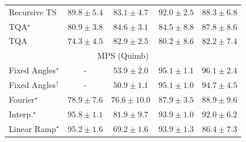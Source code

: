 \begin{tabular}{l|cccc|}
Recursive TS & {\cellcolor[HTML]{821781}} \color[HTML]{F1F1F1} $89.8\pm 5.4$ & {\cellcolor[HTML]{8950A4}} \color[HTML]{F1F1F1} $83.1\pm 4.7$ & {\cellcolor[HTML]{760C71}} \color[HTML]{F1F1F1} $92.0\pm 2.5$ & {\cellcolor[HTML]{84258B}} \color[HTML]{F1F1F1} $88.3\pm 6.8$ \\
TQA$^\star$ & {\cellcolor[HTML]{8B60AC}} \color[HTML]{F1F1F1} $80.9\pm 3.8$ & {\cellcolor[HTML]{88449E}} \color[HTML]{F1F1F1} $84.6\pm 3.1$ & {\cellcolor[HTML]{88459F}} \color[HTML]{F1F1F1} $84.5\pm 8.8$ & {\cellcolor[HTML]{85288D}} \color[HTML]{F1F1F1} $87.8\pm 8.6$ \\
TQA & {\cellcolor[HTML]{8C91C4}} \color[HTML]{F1F1F1} $74.3\pm 4.5$ & {\cellcolor[HTML]{8A51A5}} \color[HTML]{F1F1F1} $82.9\pm 2.5$ & {\cellcolor[HTML]{8B65AE}} \color[HTML]{F1F1F1} $80.2\pm 8.6$ & {\cellcolor[HTML]{8A56A7}} \color[HTML]{F1F1F1} $82.2\pm 7.4$ \\
\cline{1-5}
\multicolumn{5}{c}{\rule{0pt}{8pt}MPS (Quimb)} \\
\midrule
Fixed Angles$^\star$ & {\cellcolor[HTML]{000000}} \color[HTML]{F1F1F1} {\cellcolor{white}} \color{black} - & {\cellcolor[HTML]{FFFBD0}} \color[HTML]{000000} $53.9\pm 2.0$ & {\cellcolor[HTML]{712806}} \color[HTML]{F1F1F1} $95.1\pm 1.1$ & {\cellcolor[HTML]{692606}} \color[HTML]{F1F1F1} $96.1\pm 2.4$ \\
Fixed Angles$^\dagger$ & {\cellcolor[HTML]{000000}} \color[HTML]{F1F1F1} {\cellcolor{white}} \color{black} - & {\cellcolor[HTML]{FFFFE5}} \color[HTML]{000000} $50.9\pm 1.1$ & {\cellcolor[HTML]{712806}} \color[HTML]{F1F1F1} $95.1\pm 1.0$ & {\cellcolor[HTML]{762A05}} \color[HTML]{F1F1F1} $94.7\pm 4.5$ \\
Fourier$^\star$ & {\cellcolor[HTML]{ED7316}} \color[HTML]{F1F1F1} $78.9\pm 7.6$ & {\cellcolor[HTML]{F5841E}} \color[HTML]{F1F1F1} $76.6\pm 10.0$ & {\cellcolor[HTML]{B34003}} \color[HTML]{F1F1F1} $87.9\pm 3.5$ & {\cellcolor[HTML]{A93C03}} \color[HTML]{F1F1F1} $88.9\pm 9.6$ \\
Interp.$^\star$ & {\cellcolor[HTML]{6B2606}} \color[HTML]{F1F1F1} $95.8\pm 1.1$ & {\cellcolor[HTML]{DD5F0C}} \color[HTML]{F1F1F1} $81.9\pm 9.7$ & {\cellcolor[HTML]{7C2C05}} \color[HTML]{F1F1F1} $93.9\pm 1.0$ & {\cellcolor[HTML]{8E3104}} \color[HTML]{F1F1F1} $92.0\pm 6.2$ \\
Linear Ramp$^\star$ & {\cellcolor[HTML]{712806}} \color[HTML]{F1F1F1} $95.2\pm 1.6$ & {\cellcolor[HTML]{FEBB47}} \color[HTML]{000000} $69.2\pm 1.6$ & {\cellcolor[HTML]{7C2C05}} \color[HTML]{F1F1F1} $93.9\pm 1.3$ & {\cellcolor[HTML]{C04602}} \color[HTML]{F1F1F1} $86.4\pm 7.3$ \\

\end{tabular}

